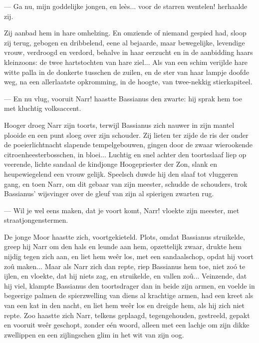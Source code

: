 \documentclass[a4paper, 12pt, oneside, dutch]{article}
\begin{document}
--- Ga nu, mijn goddelijke jongen, en leès... voor de starren wentelen! herhaalde zij.

Zij aanbad hem in hare omhelzing. En omziende of niemand gespied had, sloop zij terug, gebogen en dribbelend, eene al bejaarde, maar bewegelijke, levendige vrouw, verdroogd en verdord, behalve in haar eerzucht en in de aanbidding haars kleinzoons: de twee hartstochten van hare ziel... Als van een schim verijlde hare witte palla in de donkerte tusschen de zuilen, en de ster van haar lampje doofde weg, na een allerlaatste opkromming, in de hoogte, van twee-nekkig stierkapiteel.

--- En nu vlug, vooruit Narr! haastte Bassianus den zwarte: hij sprak hem toe met kluchtig volksaccent.

Hooger droeg Narr zijn toorts, terwijl Bassianus zich nauwer in zijn mantel plooide en een punt sloeg over zijn schouder. Zij lieten ter zijde de ris der onder de poeierlichtnacht slapende tempelgebouwen, gingen door de zwaar wierookende citroenheesterbosschen, in bloei... Luchtig en snel achter den toortsslaaf liep op veerende, lichte sandaal de kindjonge Hoogepriester der Zon, slank en heupewiegelend een vrouw gelijk. Speelsch duwde hij den slaaf tot vluggeren gang, en toen Narr, om dit gebaar van zijn meester, schudde de schouders, trok Bassianus' wijsvinger over de gleuf van zijn al spierigen zwarten rug.

--- Wil je wel eens maken, dat je voort komt, Narr! vloekte zijn meester, met straatjongenstermen.

De jonge Moor haastte zich, voortgekieteld. Plots, omdat Bassianus struikelde, greep hij Narr om den hals en leunde aan hem, opzettelijk zwaar, drukte hem nijdig tegen zich aan, en liet hem weêr los, met een sandaalschop, opdat hij voort zoû maken... Maar als Narr zich dan repte, riep Bassianus hem toe, niet zoó te ijlen, en vloekte, dat hij niets zag, en struikelde, en vallen zoû... Veinzende, dat hij viel, klampte Bassianus den toortsdrager dan in beide zijn armen, en voelde in begeerige palmen de spierzwelling van diens al krachtige armen, had een kreet als van een kat in den nacht, en liet hem weêr los en dreigde hem, als hij zich niet repte. Zoo haastte zich Narr, telkens geplaagd, tegengehouden, gestreeld, gepakt en vooruit weêr geschopt, zonder eén woord, alleen met een lachje om zijn dikke zwellippen en een zijlingschen glim in het wit van zijn oog.
\end{document}
